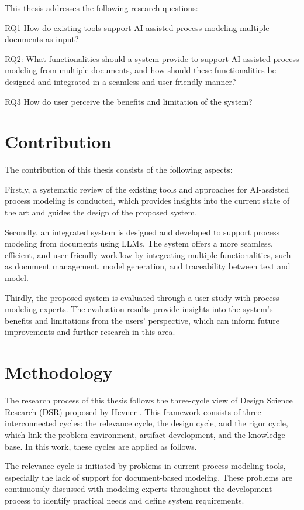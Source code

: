 \label{sec:intro:rq}

This thesis addresses the following research questions:

RQ1 How do existing tools support AI-assisted process modeling multiple documents as input?

RQ2: What functionalities should a system provide to support AI-assisted process modeling from multiple documents, and how should these functionalities be designed and integrated in a seamless and user-friendly manner?

RQ3 How do user perceive the benefits and limitation of the system?

\section{Contribution}
\label{sec:intro:con}
The contribution of this thesis consists of the following aspects:

Firstly, a systematic review of the existing tools and approaches for AI-assisted process modeling is conducted, which provides insights into the current state of the art and guides the design of the proposed system.

Secondly, an integrated system is designed and developed to support process modeling from documents using LLMs. The system offers a more seamless, efficient, and user-friendly workflow by integrating multiple functionalities, such as document management, model generation, and traceability between text and model.

Thirdly, the proposed system is evaluated through a user study with process modeling experts. The evaluation results provide insights into the system’s benefits and limitations from the users’ perspective, which can inform future improvements and further research in this area.

\section{Methodology}
\label{sec:intro:meth}
The research process of this thesis follows the three-cycle view of Design Science Research (DSR) proposed by Hevner \cite{hevner2007}. This framework consists of three interconnected cycles: the relevance cycle, the design cycle, and the rigor cycle, which link the problem environment, artifact development, and the knowledge base. In this work, these cycles are applied as follows.

The relevance cycle is initiated by problems in current process modeling tools, especially the lack of support for document-based modeling. These problems are continuously discussed with modeling experts throughout the development process to identify practical needs and define system requirements.

